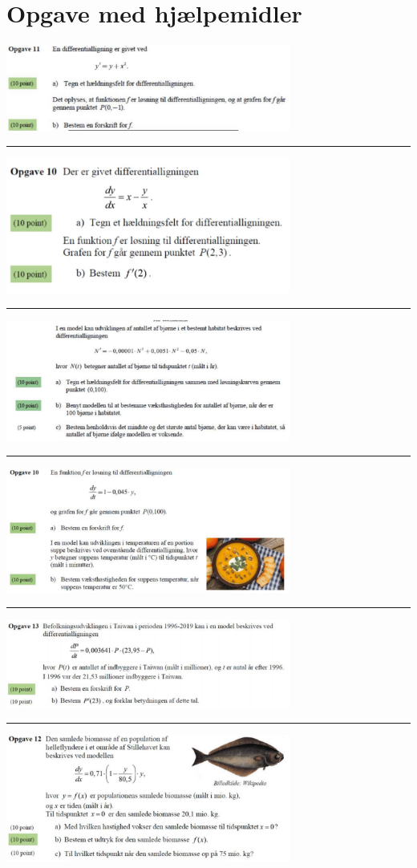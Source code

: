 \section*{Opgave med hjælpemidler}
\begin{center}
	\includegraphics[width=0.7\textwidth]{Billeder/opg1m.jpg}
	\hrule
	\includegraphics[width=0.7\textwidth]{Billeder/opg2m.jpg}
	\hrule
	\includegraphics[width=0.7\textwidth]{Billeder/opg3m.jpg}
	\hrule
	\includegraphics[width=0.7\textwidth]{Billeder/opg4m.jpg}
	\hrule
	\includegraphics[width=0.7\textwidth]{Billeder/opg5m.jpg}
	\hrule
	\includegraphics[width=0.7\textwidth]{Billeder/opg6m.jpg}

\end{center}
